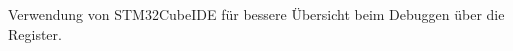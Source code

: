 Verwendung von STM32CubeIDE für bessere Übersicht beim Debuggen über die Register.
\\

%
%
%
%



























